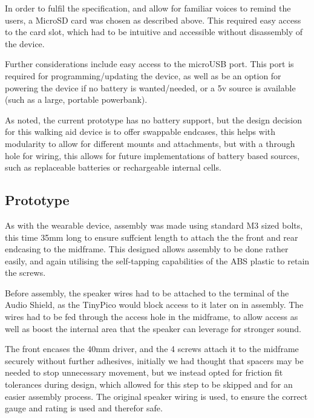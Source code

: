             In order to fulfil the specification, and allow for familiar voices to remind the users, a MicroSD card was chosen as described above. This required easy access to the card slot, which had to be intuitive and accessible without disassembly of the device.

            

            Further considerations include easy access to the microUSB port. This port is required for programming/updating the device, as well as be an option for powering the device if no battery is wanted/needed, or a 5v source is available (such as a large, portable powerbank).

            As noted, the current prototype has no battery support, but the design decision for this walking aid device is to offer swappable endcases, this helps with modularity to allow for different mounts and attachments, but with a through hole for wiring, this allows for future implementations of battery based sources, such as replaceable batteries or rechargeable internal cells.


        \subsection{Prototype}
        \label{subsec:prototype_walking_aid}

            As with the wearable device, assembly was made using standard M3 sized bolts, this time 35mm long to ensure suffcient length to attach the the front and rear endcasing to the midframe. This designed allows assembly to be done rather easily, and again utilising the self-tapping capabilities of the ABS plastic to retain the screws.

            Before assembly, the speaker wires had to be attached to the terminal of the Audio Shield, as the TinyPico would block access to it later on in assembly. The wires had to be fed through the access hole in the midframe, to allow access as well as boost the internal area that the speaker can leverage for stronger sound.

            

            The front encases the 40mm driver, and the 4 screws attach it to the midframe securely without further adhesives, initially we had thought that spacers may be needed to stop unnecessary movement, but we instead opted for friction fit tolerances during design, which allowed for this step to be skipped and for an easier assembly process. The original speaker wiring is used, to ensure the correct gauge and rating is used and therefor safe.

